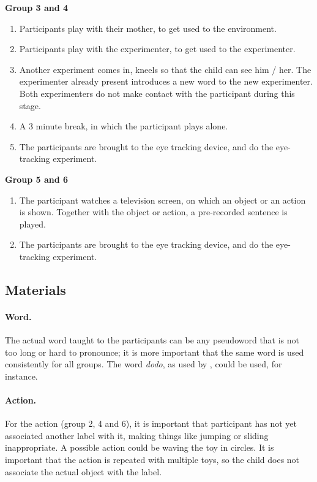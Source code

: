 \documentclass[12pt]{article}
\begin{document}
\textbf{Group 3 and 4}
\begin{enumerate}
\item Participants play with their mother, to get used to the environment.
\item Participants play with the experimenter, to get used to the experimenter.
\item Another experiment comes in, kneels so that the child can see him / her. The experimenter already present introduces a new word to the new experimenter. Both experimenters do not make contact with the participant during this stage.
\item A 3 minute break, in which the participant plays alone.
\item The participants are brought to the eye tracking device, and do the eye-tracking experiment.
\end{enumerate}

\textbf{Group 5 and 6}
\begin{enumerate}
\item The participant watches a television screen, on which an object or an action is shown. Together with the object or action, a pre-recorded sentence is played.
\item The participants are brought to the eye tracking device, and do the eye-tracking experiment.
\end{enumerate}

\subsection{Materials}
\paragraph{Word.} The actual word taught to the participants can be any pseudoword that is not too long or hard to pronounce; it is more important that the same word is used consistently for all groups. The word \emph{dodo}, as used by \citet{ddc93}, could be used, for instance.
\paragraph{Action.} For the action (group 2, 4 and 6), it is important that participant has not yet associated another label with it, making things like jumping or sliding inappropriate. A possible action could be waving the toy in circles. It is important that the action is repeated with multiple toys, so the child does not associate the actual object with the label. 
\end{document}

